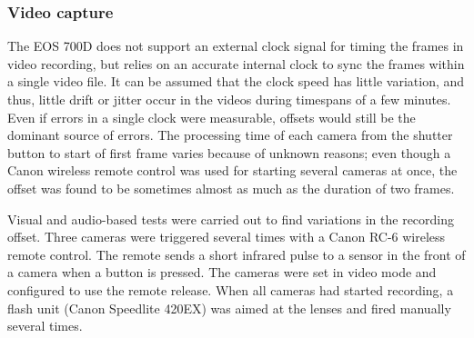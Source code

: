 
%

\subsubsection{Video capture}


The EOS 700D does not support an external clock signal for timing the frames in video recording, but relies on an accurate internal clock to sync the frames within a single video file.
It can be assumed that the clock speed has little variation, and thus, little drift or jitter occur in the videos during timespans of a few minutes.
Even if errors in a single clock were measurable, offsets would still be the dominant source of errors.
The processing time of each camera from the shutter button to start of first frame varies because of unknown reasons; even though a Canon wireless remote control was used for starting several cameras at once, the offset was found to be sometimes almost as much as the duration of two frames.


Visual and audio-based tests were carried out to find variations in the recording offset.
Three cameras were triggered several times with a Canon RC-6 wireless remote control.
The remote sends a short infrared pulse to a sensor in the front of a camera when a button is pressed.
The cameras were set in video mode and configured to use the remote release.
When all cameras had started recording, a flash unit (Canon Speedlite 420EX) was aimed at the lenses and fired manually several times.

